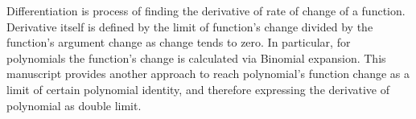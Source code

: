 Differentiation is process of finding the derivative of rate of change of a function.
Derivative itself is defined by the limit of function's change divided by the function's argument change
as change tends to zero.
In particular, for polynomials the function's change is calculated via Binomial expansion.
This manuscript provides another approach to reach polynomial's function change as a limit of certain polynomial identity,
and therefore expressing the derivative of polynomial as double limit.
